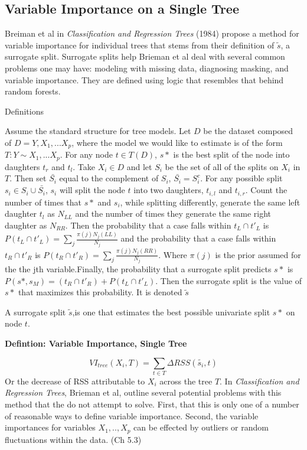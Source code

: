 \documentclass[12pt,twoside]{reedthesis}
\begin{document}
  \subsection{Variable Importance on a Single
  Tree}\label{variable-importance-on-a-single-tree}
  
  Breiman et al in \emph{Classification and Regression Trees} (1984)
  propose a method for variable importance for individual trees that stems
  from their definition of \(\tilde{s}\), a surrogate split. Surrogate
  splits help Brieman et al deal with several common problems one may
  have: modeling with missing data, diagnosing masking, and variable
  importance. They are defined using logic that resembles that behind
  random forests.
  
  Definitions
  
  Assume the standard structure for tree models. Let \(D\) be the dataset
  composed of \(D = {Y, X_1,...X_p}\), where the model we would like to
  estimate is of the form \(T: Y \sim X_1,...X_p\). For any node
  \(t \in T(D)\), \(s*\) is the best split of the node into daughters
  \(t_r\) and \(t_l\). Take \(X_i \in D\) and let \(S_i\) be the set of
  all of the splits on \(X_i\) in \(T\). Then set \(\bar{S_i}\) equal to
  the complement of \(S_i\), \(\bar{S_i} = S_i^c\). For any possible split
  \(s_i \in S_i \cup \bar{S_i}\), \(s_i\) will split the node \(t\) into
  two daughters, \(t_{i,l}\) and \(t_{i,r}\). Count the number of times
  that \(s*\) and \(s_i\), while splitting differently, generate the same
  left daughter \(t_{l}\) as \(N_{LL}\) and the number of times they
  generate the same right daughter as \(N_{RR}\). Then the probability
  that a case falls within \(t_L \cap t'_L\) is
  \(P(t_L \cap t'_L) = \sum_j \frac{\pi(j) N_j(LL)}{N_j}\) and the
  probability that a case falls within \(t_R \cap t'_R\) is
  \(P(t_R \cap t'_R) = \sum_j \frac{\pi(j) N_j(RR)}{N_j}\). Where
  \(\pi(j)\) is the prior assumed for the the jth variable.Finally, the
  probability that a surrogate split predicts \(s*\) is
  \(P(s*, s_M) = (t_R \cap t'_R) + P(t_L \cap t'_L)\). Then the surrogate
  split is the value of \(s*\) that maximizes this probability. It is
  denoted \(\tilde{s}\)
  
  A surrogate split \(\tilde{s}\),is one that estimates the best possible
  univariate split \(s*\) on node \(t\).
  
  \textbf{Defintion: Variable Importance, Single Tree}
  
  \[VI_{tree}(X_i, T) = \sum_{t \in T} \Delta RSS(\tilde{s_i}, t)\] Or the
  decrease of RSS attributable to \(X_i\) across the tree \(T\). In
  \emph{Classification and Regression Trees}, Brieman et al, outline
  several potential problems with this method that the do not attempt to
  solve. First, that this is only one of a number of reasonable ways to
  define variable importance. Second, the variable importances for
  variables \(X_1,..,X_p\) can be effected by outliers or random
  fluctuations within the data. (Ch 5.3)
  
\end{document}

